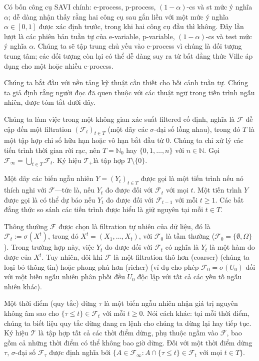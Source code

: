Có bốn công cụ SAVI chính: e-process, p-process, $(1 - \alpha)$-\gls{cs} và
\gls{st} mức ý nghĩa $\alpha$; dễ dàng nhận thấy rằng hai công
cụ sau gắn liền với một mức ý nghĩa $\alpha \in [0, 1]$ được xác định trước,
trong khi hai công cụ đầu thì không. Đây lần lượt là các phiên bản tuần tự của
e-variable, p-variable, $(1 - \alpha)$-\gls{cs} và \gls{test} mức ý nghĩa
$\alpha$. Chúng ta sẽ tập trung chủ yếu vào e-process vì chúng là đối tượng
trung tâm; các đối tượng còn lại có thể dễ dàng suy ra từ bất đẳng thức Ville
áp dụng cho một hoặc nhiều e-process.

Chúng ta bắt đầu với nền tảng kỹ thuật cần thiết cho bối cảnh tuần tự. Chúng ta
giả định rằng người đọc đã quen thuộc với các thuật ngữ trong tiến trình ngẫu
nhiên, được tóm tắt dưới đây.

Chúng ta làm việc trong một không gian xác suất \gls{filtered} cố định,
nghĩa là $\mathcal{F}$ đề cập đến một \gls{filtration} $(\mathcal{F}_t)_{t
\in T}$ (một dãy các $\sigma$-đại số lồng nhau), trong đó $T$ là một tập hợp
chỉ số hữu hạn hoặc vô hạn bắt đầu từ 0. Chúng ta chỉ xử lý các tiến trình thời
gian rời rạc, nên $T = \mathbb{N}_0$ hay $\{0, 1, \dots, n\}$ với $n \in
\mathbb{N}$. Gọi $\mathcal{F}_\infty = \bigcup_{t \in T} \mathcal{F}_t$. Ký
hiệu $\mathcal{T}_+$là tập hợp $T \setminus \{0\}$.

Một dãy các biến ngẫu nhiên $Y = (Y_t)_{t \in T}$ được gọi là một tiến trình
nếu nó thích nghi với $\mathcal{F}$—tức là, nếu $Y_t$ đo được đối với
$\mathcal{F}_t$ với mọi $t$. Một tiến trình $Y$ được gọi là có thể dự báo nếu
$Y_t$ đo được đối với $\mathcal{F}_{t-1}$ với mỗi $t \geq 1$. Các bất đẳng thức
so sánh các tiến trình được hiểu là giữ nguyên tại mỗi $t \in T$.

Thông thường $\mathcal{F}$ được chọn là \gls{filtration} tự nhiên của dữ liệu,
đó là $\mathcal{F}_t := \sigma(X^t)$, trong đó $X^t = (X_1, \dots, X_t)$, với
$\mathcal{F}_0$ là tầm thường ($\mathcal{F}_0 = \{\emptyset, \Omega\}$). Trong
trường hợp này, việc $Y_t$ đo được đối với $\mathcal{F}_t$ có nghĩa là $Y_t$ là
một hàm đo được của $X^t$. Tuy nhiên, đôi khi $\mathcal{F}$ là một
\gls{filtration} thô hơn (coarser) (chúng ta loại bỏ thông tin) hoặc phong phú
hơn (richer) (ví dụ cho phép $\mathcal{F}_0 = \sigma(U_0)$ đối với một biến
ngẫu nhiên phân phối đều $U_0$ độc lập với tất cả các yếu tố ngẫu nhiên khác).

Một thời điểm (quy tắc) dừng $\tau$ là một biến ngẫu nhiên nhận giá trị nguyên
không âm sao cho $\{\tau \leq t\} \in \mathcal{F}_t$ với mỗi $t \geq 0$. Nói
cách khác: tại mỗi thời điểm, chúng ta biết liệu quy tắc dừng đang ra lệnh cho
chúng ta dừng lại hay tiếp tục. Ký hiệu $\mathcal{T}$ là tập hợp tất cả các
thời điểm dừng, phụ thuộc ngầm vào $\mathcal{F}$, bao gồm cả những thời điểm có
thể không bao giờ dừng. Đối với một thời điểm dừng $\tau$, $\sigma$-đại
số $\mathcal{F}_\tau$ được định nghĩa bởi $\{A \in \mathcal{F}_\infty : A \cap
\{\tau \leq t\} \in \mathcal{F}_t \text{ với mọi } t \in T\}$.

